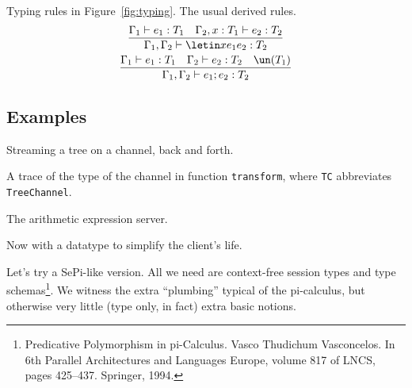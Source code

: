 



Typing rules in Figure~\ref{fig:typing}.
%
The usual derived rules.
%
\begin{gather*}
  \frac{
    \Gamma_1 \vdash e_1:T_1
    \quad
    \Gamma_2,x:T_1 \vdash e_2:T_2
  }{
    \Gamma_1,\Gamma_2 \vdash \letin x {e_1}{e_2} : T_2
  }
\\
  \frac{
    \Gamma_1 \vdash e_1:T_1
    \quad
    \Gamma_2 \vdash e_2:T_2
    \quad
    \un(T_1)
  }{
    \Gamma_1,\Gamma_2  \vdash e_1;e_2 : T_2
  }
\end{gather*}


\subsection{Examples}
\label{sec:examples}

Streaming a tree on a channel, back and forth.



A trace of the type of the channel in function \lstinline|transform|,
where \lstinline|TC| abbreviates \lstinline|TreeChannel|.



The arithmetic expression server.



Now with a datatype to simplify the client's life.



Let's try a SePi-like version. All we need are context-free session
types and type schemas\footnote{Predicative Polymorphism in
  pi-Calculus. Vasco Thudichum Vasconcelos. In 6th Parallel
  Architectures and Languages Europe, volume 817 of LNCS, pages
  425--437. Springer, 1994.}. We witness the extra ``plumbing''
typical of the pi-calculus, but otherwise very little (type only, in
fact) extra basic notions.



